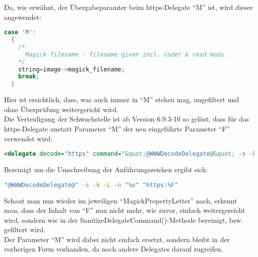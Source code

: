 Da, wie erwähnt, der Übergabeparamter beim https-Delegate "`M"' ist, wird dieser angewendet:\\

\begin{lstlisting}[firstnumber=2627, language=C, caption=magick/property.c Ungefilterte Weitergabe M-Parameter,label={lst:lstlisting}]
  case 'M':
  {
    /*
      Magick filename - filename given incl. coder & read mods.
    */
    string=image->magick_filename;
    break;
  }
\end{lstlisting}
\vspace{5mm}

Hier ist ersichtlich, dass, was auch immer in "`M"' stehen mag, ungefiltert und ohne Überprüfung weitergericht wird.\\

Die Verteidigung der Schwachstelle ist ab Version 6.9.3-10 so gelöst, dass für das https-Delegate anstatt Parameter "`M"' der neu eingeführte Parameter "`F"' verwendet wird:\\

\begin{lstlisting}[firstnumber=91, language=XML, caption=config/delegates.xml.in https-Delegate 6.9.3-10,label={lst:lstlisting}]
  <delegate decode="https" command="&quot;@WWWDecodeDelegate@&quot; -s -k -L -o &quot;%o&quot; &quot;https:%F&quot;"/>
\end{lstlisting}
\vspace{5mm}

Bereinigt um die Umschreibung der Anführungszeichen ergibt sich:\\

\begin{lstlisting}[firstnumber=1, language=Bash, caption=Aufgelöster https-Delegate-Befehl 6.9.3-10,label={lst:lstlisting}]
"@WWWDecodeDelegate@" -s -k -L -o "%o" "https:%F"
\end{lstlisting}
\vspace{5mm}

Schaut man nun wieder im jeweiligen "`MagickPropertyLetter"' nach, erkennt man, dass der Inhalt von "`F"' nun nicht mehr, wie zuvor, einfach weitergereicht wird, sondern wie in der SanitizeDelegateCommand()-Methode bereinigt, bzw. gefiltert wird.\\
Der Parameter "`M"' wird dabei nicht einfach ersetzt, sondern bleibt in der vorherigen Form vorhanden, da noch andere Delegates darauf zugreifen.\\

